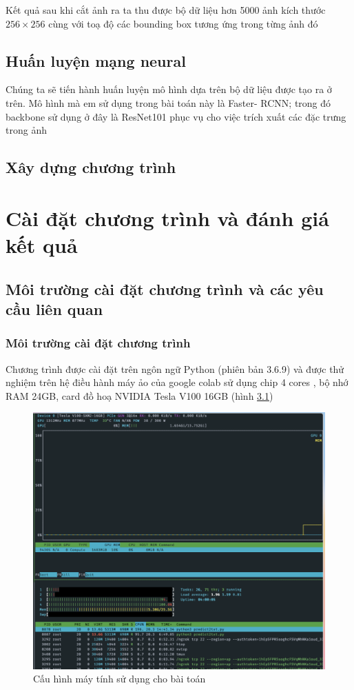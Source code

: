 \documentclass[a4paper, 12pt]{report}
\begin{document}
Kết quả sau khi cắt ảnh ra ta thu được bộ dữ liệu hơn 5000 ảnh kích thước $256 \times 256$ cùng với toạ độ các bounding box tương ứng trong từng ảnh đó
\section{Huấn luyện mạng neural}
Chúng ta sẽ tiến hành huấn luyện mô hình dựa trên bộ dữ liệu được tạo ra ở trên.  Mô hình mà em sử dụng trong bài toán này là Faster- RCNN; trong đó backbone sử dụng ở đây là ResNet101 phục vụ cho việc trích xuất các đặc trưng trong ảnh
\section{Xây dựng chương trình}

\chapter{Cài đặt chương trình và đánh giá kết quả}

\section{Môi trường cài đặt chương trình và các yêu cầu liên quan}
\subsection{Môi trường cài đặt chương trình}
Chương trình được cài đặt trên ngôn ngữ Python (phiên bản 3.6.9) và được thử nghiệm trên hệ điều hành máy ảo của google colab sử dụng chip 4 cores , bộ nhớ RAM 24GB,  card đồ hoạ NVIDIA Tesla V100 16GB (hình \ref{fig:nvidia-smi})
 \begin{figure}[!h]
	\centering
	\includegraphics[width=0.8\linewidth]{Images/nvidia-smi}
	\caption{Cấu hình máy tính sử dụng cho bài toán}
	\label{fig:nvidia-smi}
\end{figure}
\end{document}
